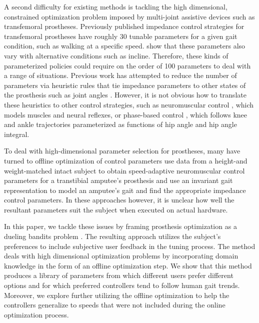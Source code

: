 A second difficulty for existing methods is tackling the high dimensional,
constrained optimization problem imposed by multi-joint assistive devices such
as transfemoral prostheses. Previously published impedance control strategies
for transfemoral prostheses have roughly 30 tunable parameters for a given gait
condition, such as walking at a specific speed. \citet{sup2011upslope} show that
these parameters also vary with alternative conditions such as incline.
Therefore, these kinds of parameterized policies could require on the order of
100 parameters to deal with a range of situations. Previous work has attempted
to reduce the number of parameters via heuristic rules that tie impedance
parameters to other states of the prosthesis such as joint angles
\citep{simon2014configuring}.  However, it is not obvious how to translate these
heuristics to other control strategies, such as neuromuscular control
\citep{thatte2016toward}, which models muscles and neural reflexes, or
phase-based control \citep{quintero2016preliminary}, which follows knee and
ankle trajectories parameterized as functions of hip angle and hip angle
integral.

To deal with high-dimensional parameter selection for prostheses, many have
turned to offline optimization of control parameters \citet{markowitz2011speed}
use data from a height-and weight-matched intact subject to obtain
speed-adaptive neuromuscular control parameters for a transtibial amputee's
prosthesis and \citet{aghasadeghi2013learning} use an invariant gait
representation to model an amputee's gait and find the appropriate impedance
control parameters. In these approaches however, it is unclear how well the
resultant parameters suit the subject when executed on actual hardware.

In this paper, we tackle these issues by framing prosthesis optimization as a
dueling bandits problem \citep{yue2012k}. The resulting approach utilizes the
subject's preferences to include subjective user feedback in the tuning process.
The method deals with high dimensional optimization problems by incorporating
domain knowledge in the form of an offline optimization step. We show that this
method produces a library of parameters from which different users prefer
different options and for which preferred controllers tend to follow human gait
trends. Moreover, we explore further utilizing the offline optimization to help
the controllers generalize to speeds that were not included during the online
optimization process.
